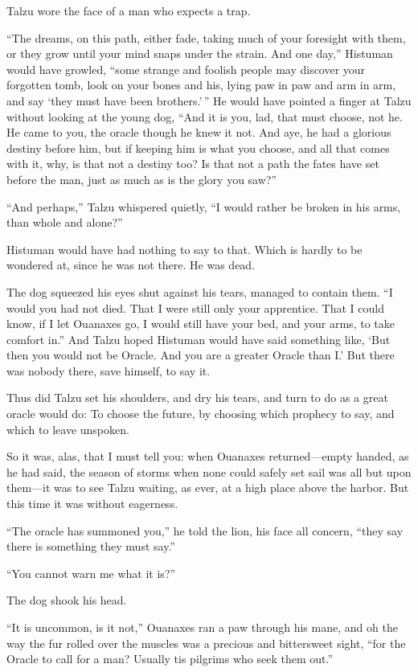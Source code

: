 Talzu wore the face of a man who expects a trap.

``The dreams, on this path, either fade, taking much of your foresight with them, or they grow until your mind snaps under the strain. And one day,'' Histuman would have growled, ``some strange and foolish people may discover your forgotten tomb, look on your bones and his, lying paw in paw and arm in arm, and say `they must have been brothers.'\,'' He would have pointed a finger at Talzu without looking at the young dog, ``And it is you, lad, that must choose, not he. He came to you, the oracle though he knew it not. And aye, he had a glorious destiny before him, but if keeping him is what you choose, and all that comes with it, why, is that not a destiny too? Is that not a path the fates have set before the man, just as much as is the glory you saw?''

``And perhaps,'' Talzu whispered quietly, ``I would rather be broken in his arms, than whole and alone?''

Histuman would have had nothing to say to that. Which is hardly to be wondered at, since he was not there. He was dead.

The dog squeezed his eyes shut against his tears, managed to contain them. ``I would you had not died. That I were still only your apprentice. That I could know, if I let Ouanaxes go, I would still have your bed, and your arms, to take comfort in.'' And Talzu hoped Histuman would have said something like, `But then you would not be Oracle. And you are a greater Oracle than I.' But there was nobody there, save himself, to say it.

Thus did Talzu set his shoulders, and dry his tears, and turn to do as a great oracle would do: To choose the future, by choosing which prophecy to say, and which to leave unspoken.

\secdiv

\noindent So it was, alas, that I must tell you: when Ouanaxes returned---empty handed, as he had said, the season of storms when none could safely set sail was all but upon them---it was to see Talzu waiting, as ever, at a high place above the harbor. But this time it was without eagerness.

``The oracle has summoned you,'' he told the lion, his face all concern, ``they say there is something they must say.''

``You cannot warn me what it is?''

The dog shook his head.

``It is uncommon, is it not,'' Ouanaxes ran a paw through his mane, and oh the way the fur rolled over the muscles was a precious and bittersweet sight, ``for the Oracle to call for a man? Usually tis pilgrims who seek them out.''

